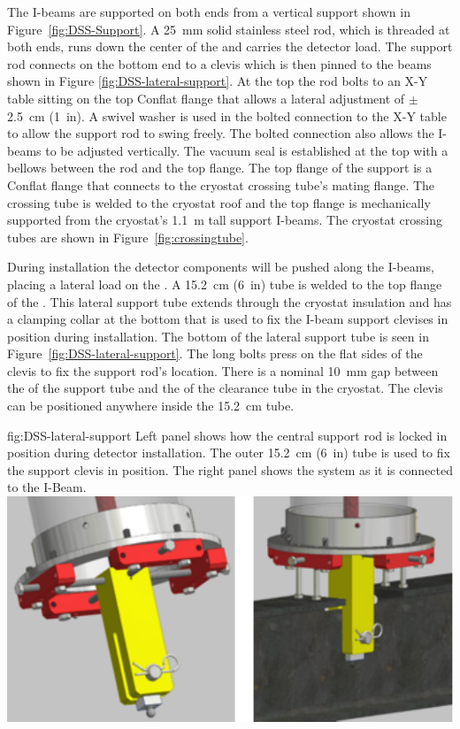The  I-beams are supported on both ends from a vertical support \fdth shown in Figure~\ref{fig:DSS-Support}. A \SI{25}{mm} solid stainless steel rod, which is threaded at both ends, runs down the center of the \fdth and carries the detector load. The support rod connects on the bottom end to a clevis which is then pinned to the  beams shown in Figure \ref{fig:DSS-lateral-support}. At the top the rod bolts to an X-Y table sitting on the top Conflat flange that allows a lateral adjustment of $\pm$\SI{2.5}{cm} (\SI{1}{in}). A swivel washer is used in the bolted connection to the X-Y table to allow the support rod to swing freely. The bolted connection also allows the  I-beams to be adjusted vertically. The vacuum seal is established at the top with a bellows between the rod and the top flange. The top flange of the  support \fdth is a Conflat flange that connects to the cryostat crossing tube's mating flange. The crossing  tube is welded to the cryostat roof and the top flange is mechanically supported from the cryostat's  \SI{1.1}{m} tall support I-beams. The cryostat crossing tubes are shown in Figure~\ref{fig:crossingtube}.

During installation the detector components will be pushed along the  I-beams, placing a lateral load on the . %
A \SI{15.2}{cm} (\SI{6}{in})   tube is welded to the top flange of the  \fdth{}. 
This lateral support tube  extends through the cryostat insulation and has a clamping collar at the bottom that is used to fix the I-beam support clevises in position during installation. 
The bottom of the lateral support tube is seen in Figure~\ref{fig:DSS-lateral-support}. 
The long bolts press on the flat sides of the clevis to fix the support rod's location. 
There is a nominal \SI{10}{mm} gap between the  of the support tube and the  of the clearance tube in the cryostat. 
The clevis can be positioned anywhere inside the \SI{15.2}{cm} tube.




\begin{dunefigure}{fig:DSS-lateral-support}
  {Left panel shows how the central support rod is locked in position during detector installation. The outer  \SI{15.2}{cm} (\SI{6}{in}) tube is used to fix the support clevis in position. The right panel shows the system as it is connected to the I-Beam.}
\includegraphics[width=.75\textwidth]{graphics/dss-lateral-support.pdf}
\end{dunefigure}

